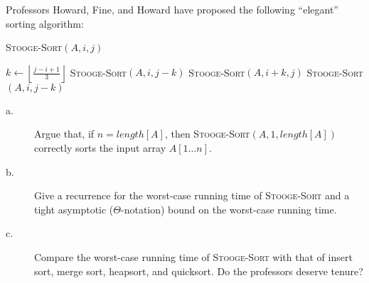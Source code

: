 Professors Howard, Fine, and Howard have proposed the following ``elegant'' sorting algorithm:

\begin{algorithm}[H]
\caption{\textsc{Stooge-Sort}$(A, i, j)$}
$k\leftarrow \left\lfloor\frac{j - i + 1}{3}\right\rfloor$
\textsc{Stooge-Sort}$(A, i, j - k)$
\textsc{Stooge-Sort}$(A, i +k, j)$
\textsc{Stooge-Sort}$(A, i, j - k)$
\end{algorithm}

\begin{description}
\item[a. \hspace{9pt}] Argue that, if $n = length[A]$, then \textsc{Stooge-Sort}$(A, 1, length[A])$ correctly sorts the input array $A[1\ldots n]$.

\item[b. \hspace{9pt}] Give a recurrence for the worst-case running time of \textsc{Stooge-Sort} and a tight asymptotic ($\Theta$-notation) bound on the worst-case
running time.

\item[c. \hspace{9pt}] Compare the worst-case running time of \textsc{Stooge-Sort} with that of insert sort, merge sort, heapsort, and quicksort. Do the professors
deserve tenure?
\end{description}

\answer

